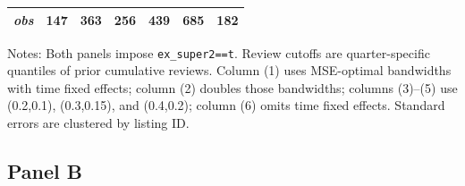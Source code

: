 \begin{table}[!htbp]
\begin{tabular}{lcccccc}
\textit{obs} & 147 & 363 & 256 & 439 & 685 & 182 \\
\bottomrule
\end{tabular}
\begin{minipage}{0.98\textwidth}\footnotesize
Notes: Both panels impose \texttt{ex\_super2==t}. Review cutoffs are quarter-specific quantiles of prior cumulative reviews. Column (1) uses MSE-optimal bandwidths with time fixed effects; column (2) doubles those bandwidths; columns (3)--(5) use (0.2,0.1), (0.3,0.15), and (0.4,0.2); column (6) omits time fixed effects. Standard errors are clustered by listing ID.
\end{minipage}
\end{table}

\subsection{Panel B}
